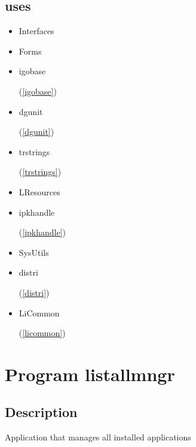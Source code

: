 \documentclass{report}
\begin{document}
\section{uses}
\begin{itemize}
\item \begin{ttfamily}Interfaces\end{ttfamily}\item \begin{ttfamily}Forms\end{ttfamily}\item \begin{ttfamily}igobase\end{ttfamily}(\ref{igobase})\item \begin{ttfamily}dgunit\end{ttfamily}(\ref{dgunit})\item \begin{ttfamily}trstrings\end{ttfamily}(\ref{trstrings})\item \begin{ttfamily}LResources\end{ttfamily}\item \begin{ttfamily}ipkhandle\end{ttfamily}(\ref{ipkhandle})\item \begin{ttfamily}SysUtils\end{ttfamily}\item \begin{ttfamily}distri\end{ttfamily}(\ref{distri})\item \begin{ttfamily}LiCommon\end{ttfamily}(\ref{licommon})\end{itemize}
\chapter{Program listallmngr}
\label{listallmngr}
\section{Description}
Application that manages all installed applications
\end{document}
